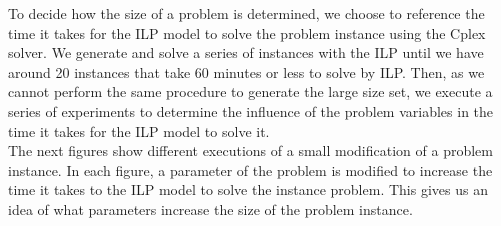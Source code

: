 To decide how the size of a problem is determined, we choose to reference the time it takes for the ILP model to solve the problem instance using the Cplex solver. We generate and solve a series of instances with the ILP until we have around 20 instances that take 60 minutes or less to solve by ILP. Then, as we cannot perform the same procedure to generate the large size set, we execute a series of experiments to determine the influence of the problem variables in the time it takes for the ILP model to solve it.\\

The next figures show different executions of a small modification of a problem instance. In each figure, a parameter of the problem is modified to increase the time it takes to the ILP model to solve the instance problem. This gives us an idea of what parameters increase the size of the problem instance.\\



